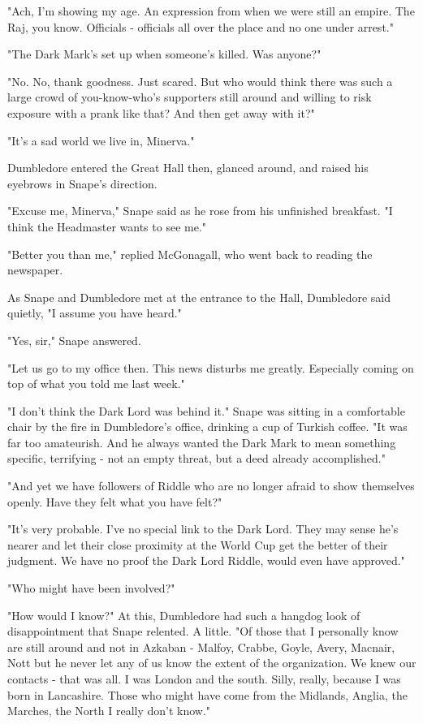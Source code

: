 "Ach, I'm showing my age. An expression from when we were still an empire. The Raj, you know. Officials - officials all over the place and no one under arrest."

"The Dark Mark's set up when someone's killed. Was anyone{\el}?"

"No. No, thank goodness. Just scared. But who would think there was such a large crowd of you-know-who's supporters still around and willing to risk exposure with a prank like that? And then get away with it?"

"It's a sad world we live in, Minerva."

Dumbledore entered the Great Hall then, glanced around, and raised his eyebrows in Snape's direction.

"Excuse me, Minerva," Snape said as he rose from his unfinished breakfast. "I think the Headmaster wants to see me."

"Better you than me," replied McGonagall, who went back to reading the newspaper.

As Snape and Dumbledore met at the entrance to the Hall, Dumbledore said quietly, "I assume you have heard."

"Yes, sir," Snape answered.

"Let us go to my office then. This news disturbs me greatly. Especially coming on top of what you told me last week."

"I don't think the Dark Lord was behind it." Snape was sitting in a comfortable chair by the fire in Dumbledore's office, drinking a cup of Turkish coffee. "It was far too amateurish. And he always wanted the Dark Mark to mean something specific, terrifying - not an empty threat, but a deed already accomplished."

"And yet we have followers of{\el} Riddle{\el} who are no longer afraid to show themselves openly. Have they felt what you have felt?"

"It's very probable. I've no special link to the Dark Lord. They may sense he's nearer and let their close proximity at the World Cup get the better of their judgment. We have no proof the Dark Lord{\el} Riddle, would even have approved."

"Who might have been involved?"

"How would I know?" At this, Dumbledore had such a hangdog look of disappointment that Snape relented. A little. "Of those that I personally know are still around and not in Azkaban - Malfoy, Crabbe, Goyle, Avery, Macnair, Nott{\el} but he never let any of us know the extent of the organization. We knew our contacts - that was all. I was London and the south. Silly, really, because I was born in Lancashire. Those who might have come from the Midlands, Anglia, the Marches, the North{\el} I really don't know."


